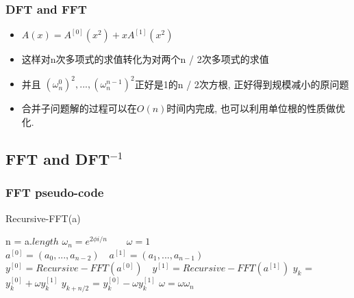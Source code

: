 \documentclass[cjk]{beamer}
\begin{document}
\begin{CJK*}{UTF8}{gbsn}
    \begin{frame}
      \frametitle{DFT and FFT}
      \begin{itemize}
        \item $A(x) = A^{[0]}(x^2) + xA^{[1]}(x^2)$
        \item 这样对n次多项式的求值转化为对两个n / 2次多项式的求值
        \item 并且 $(\omega^0_n)^2, ..., (\omega^{n - 1}_n)^2$正好是1的n / 2次方根, 正好得到规模减小的原问题
        \item 合并子问题解的过程可以在$O(n)$时间内完成, 也可以利用单位根的性质做优化.
      \end{itemize}
    \end{frame}
  \subsection{FFT and DFT$^{-1}$}
    \begin{frame}
      \frametitle{FFT pseudo-code}
          \begin{algorithm}[H]
            \caption{Recursive-FFT(a)}
            \begin{algorithmic}[1]
              \State n = a.$length$
               
              \EndIf
              \State $\omega_n = e^{2\phi i / n} \quad \quad \omega = 1$
              \State $a^{[0]} = (a_0, ..., a_{n - 2}) \quad a^{[1]} = (a_1, ..., a_{n - 1})$
              \State $y^{[0]} = Recursive-FFT(a^{[0]}) \quad y^{[1]} = Recursive-FFT(a^{[1]})$
                \State $y_k$ = $y^{[0]}_k + \omega y^{[1]}_k$
                \State $y_{k + n / 2}$ = $y^{[0]}_k - \omega y^{[1]}_k$
                \State $\omega = \omega \omega_n$
              \EndFor
              \State {}
            \end{algorithmic}
          \end{algorithm}
    \end{frame}


\end{CJK*}
\end{document}
